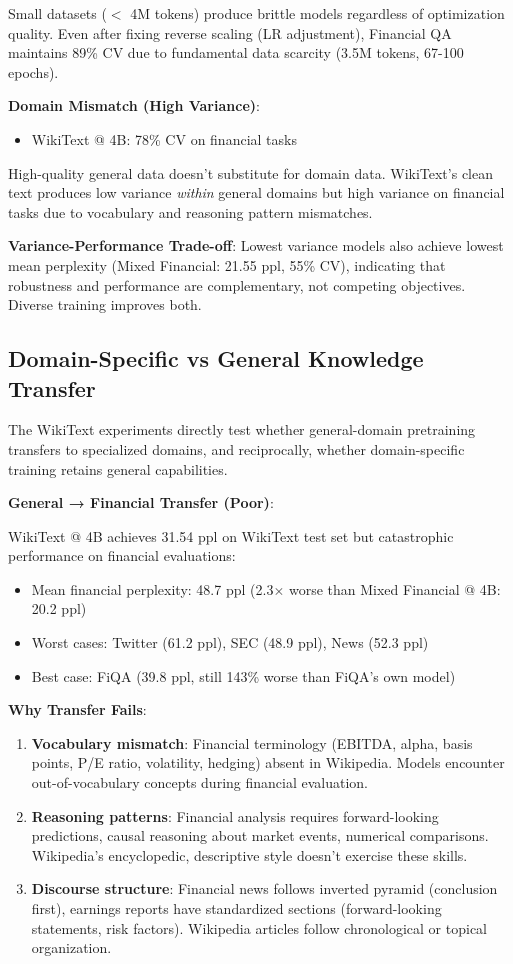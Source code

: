 Small datasets ($<$ 4M tokens) produce brittle models regardless of optimization quality. Even after fixing reverse scaling (LR adjustment), Financial QA maintains 89\% CV due to fundamental data scarcity (3.5M tokens, 67-100 epochs).

\textbf{Domain Mismatch (High Variance)}:
\begin{itemize}
\item WikiText @ 4B: 78\% CV on financial tasks
\end{itemize}

High-quality general data doesn't substitute for domain data. WikiText's clean text produces low variance \textit{within} general domains but high variance on financial tasks due to vocabulary and reasoning pattern mismatches.

\textbf{Variance-Performance Trade-off}: Lowest variance models also achieve lowest mean perplexity (Mixed Financial: 21.55 ppl, 55\% CV), indicating that robustness and performance are complementary, not competing objectives. Diverse training improves both.

\subsection{Domain-Specific vs General Knowledge Transfer}

The WikiText experiments directly test whether general-domain pretraining transfers to specialized domains, and reciprocally, whether domain-specific training retains general capabilities.

\textbf{General → Financial Transfer (Poor)}:

WikiText @ 4B achieves 31.54 ppl on WikiText test set but catastrophic performance on financial evaluations:
\begin{itemize}
\item Mean financial perplexity: 48.7 ppl (2.3$\times$ worse than Mixed Financial @ 4B: 20.2 ppl)
\item Worst cases: Twitter (61.2 ppl), SEC (48.9 ppl), News (52.3 ppl)
\item Best case: FiQA (39.8 ppl, still 143\% worse than FiQA's own model)
\end{itemize}

\textbf{Why Transfer Fails}:
\begin{enumerate}
\item \textbf{Vocabulary mismatch}: Financial terminology (EBITDA, alpha, basis points, P/E ratio, volatility, hedging) absent in Wikipedia. Models encounter out-of-vocabulary concepts during financial evaluation.
\item \textbf{Reasoning patterns}: Financial analysis requires forward-looking predictions, causal reasoning about market events, numerical comparisons. Wikipedia's encyclopedic, descriptive style doesn't exercise these skills.
\item \textbf{Discourse structure}: Financial news follows inverted pyramid (conclusion first), earnings reports have standardized sections (forward-looking statements, risk factors). Wikipedia articles follow chronological or topical organization.
\end{enumerate}


